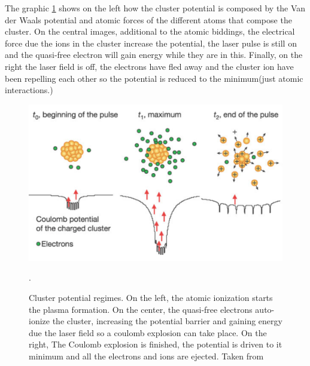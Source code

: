 {The graphic \ref{img:clusterpotential} shows on the left how the cluster potential is composed by the Van der Waals potential and atomic forces of the different atoms that compose the cluster. On the central images, additional to the atomic biddings, the electrical force due the ions in the cluster increase the potential, the laser pulse is still on and the quasi-free electron will gain energy while they are in this. Finally, on the right the laser field is off, the electrons have fled away and the cluster ion have been repelling each other so the potential is reduced to the minimum(just atomic interactions.)

\begin{figure}[h!] 

\centering
\includegraphics[scale=0.35]{../Images/clusterpotential.PNG}
\caption[Cluster potential regimes]{Cluster potential regimes. On the left, the atomic ionization starts the plasma formation. On the center, the quasi-free electrons auto-ionize the cluster, increasing the potential barrier and gaining energy due the laser field so a coulomb explosion can take place. On the right, The Coulomb explosion is finished, the potential is driven to it minimum and all the electrons and ions are ejected. Taken from \cite{wabnitz_multiple_2002}}.
\label{img:clusterpotential}
\end{figure}

}
